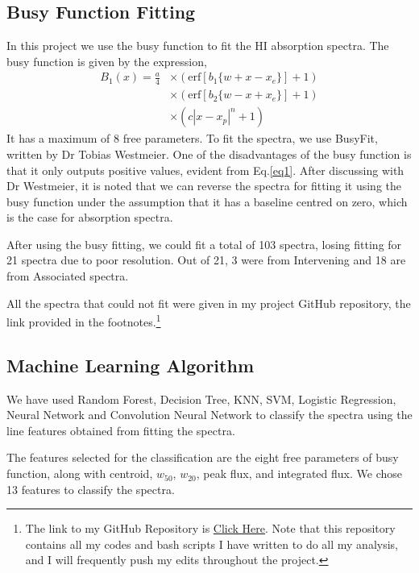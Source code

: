 \documentclass[10pt,twocolumn,letterpaper]{article}
\begin{document}
\subsection{Busy Function Fitting} \label{sec3.1}
In this project we use the busy function to fit the HI absorption spectra\cite{8}. The busy function is given by the expression,
\begin{equation} \label{eq1}
\begin{aligned}
    B_1(x) = \frac{a}{4}&\times\left( \text{erf}[b_1\{w + x - x_e\}] + 1\right)\\
    & \times \left( \text{erf}[b_2\{w - x + x_e\}] + 1\right) \\ 
    & \times \left( c|x - x_p|^n + 1 \right)
\end{aligned}
\end{equation}
It has a maximum of 8 free parameters. To fit the spectra, we use BusyFit, written by Dr Tobias Westmeier\cite{8}. One of the disadvantages of the busy function is that it only outputs positive values, evident from Eq.\eqref{eq1}. After discussing with Dr Westmeier, it is noted that we can reverse the spectra for fitting it using the busy function under the assumption that it has a baseline centred on zero, which is the case for absorption spectra.

After using the busy fitting, we could fit a total of 103 spectra, losing fitting for 21 spectra due to poor resolution. Out of 21, 3 were from Intervening and 18 are from Associated spectra.

All the spectra that could not fit were given in my project GitHub repository, the link provided in the footnotes.\footnote{The link to my GitHub Repository is \href{https://github.com/Anirudh-Srivastha-Nemmani/HI_Classification.git}{Click Here}. Note that this repository contains all my codes and bash scripts I have written to do all my analysis, and I will frequently push my edits throughout the project.}

\subsection{Machine Learning Algorithm} \label{sec3.2}

We have used Random Forest, Decision Tree, KNN, SVM, Logistic Regression, Neural Network and Convolution Neural Network to classify the spectra using the line features obtained from fitting the spectra.

The features selected for the classification are the eight free parameters of busy function, along with centroid, $w_{50}$, $w_{20}$, peak flux, and integrated flux. We chose 13 features to classify the spectra.
\end{document}
